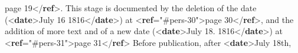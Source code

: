 \begin{shaded}
\hspace*{1em}\hspace*{1em}page 19{</\textbf{ref}>}. This stage is documented by the\mbox{}\newline 
\hspace*{1em}\hspace*{1em}\hspace*{1em}\hspace*{1em}\hspace*{1em}\hspace*{1em} deletion of the date ({<\textbf{date}>}July 16 1816{</\textbf{date}>}) at {<\textbf{ref}\hspace*{1em}{target}="{\#pers-30}">}page\mbox{}\newline 
\hspace*{1em}\hspace*{1em}\hspace*{1em}\hspace*{1em}\hspace*{1em}\hspace*{1em}\hspace*{1em}\hspace*{1em} 30{</\textbf{ref}>}, and the addition of more text and of a new date ({<\textbf{date}>}July 18.\mbox{}\newline 
\hspace*{1em}\hspace*{1em}\hspace*{1em}\hspace*{1em}\hspace*{1em}\hspace*{1em}\hspace*{1em}\hspace*{1em} 1816{</\textbf{date}>}) at {<\textbf{ref}\hspace*{1em}{target}="{\#pers-31}">}page 31{</\textbf{ref}>}\mbox{}\newline 
\hspace*{1em}\hspace*{1em}\mbox{}\newline 
\hspace*{1em}\hspace*{1em}Before publication, after {<\textbf{date}>}July 18th,\mbox{}\newline 

\end{shaded}
